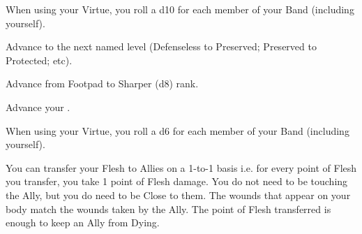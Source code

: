 \begin{multicols*}{2}

When using your  Virtue, you roll a d10 for each member of your Band (including yourself).


Advance   to the next named level (Defenseless to Preserved; Preserved to Protected; etc).


Advance  from Footpad to Sharper (d8) rank.


Advance your  \DCUP.


When using your  Virtue, you roll a d6 for each member of your Band (including yourself).


You can transfer your Flesh to Allies on a 1-to-1 basis i.e. for every point of Flesh you transfer, you take 1 point of Flesh damage. You do not need to be touching the Ally, but you do need to be Close to them.  The wounds that appear on your body match the wounds taken by the Ally.  The point of Flesh transferred is enough to keep an Ally from Dying.

\end{multicols*}
